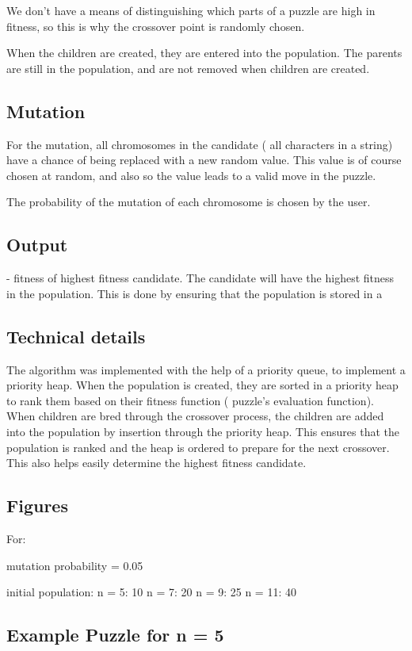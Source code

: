\documentclass{report}
\begin{document}
We don't have a means of distinguishing which parts of a puzzle are high in fitness, so this is why the crossover point is randomly chosen.

When the children are created, they are entered into the population. The parents are still in the population, and are not removed when children are created.


\subsection{Mutation}
For the mutation, all chromosomes in the candidate ( all characters in a string) have a chance of being replaced with a new random value. This value is of course chosen at random, and also so the value leads to a valid move in the puzzle.

The probability of the mutation of each chromosome is chosen by the user.	


\subsection{Output}
	- fitness of highest fitness candidate.
The candidate will have the highest fitness in the population. This is done by ensuring that the population is stored in a 


\subsection{Technical details}
The algorithm was implemented with the help of a priority queue, to implement a priority heap. When the population is created, they are sorted in a priority heap to rank them based on their fitness function ( puzzle's evaluation function). When children are bred through the crossover process, the children are added into the population by insertion through the priority heap. This ensures that the population is ranked and the heap is ordered to prepare for the next crossover. This also helps easily determine the highest fitness candidate.

\subsection{Figures}
For:

mutation probability = 0.05

initial population:
n = 5: 10
n = 7: 20
n = 9: 25
n = 11: 40



\subsection{Example Puzzle for n = 5}
\end{document}
